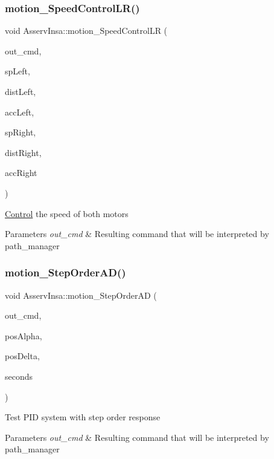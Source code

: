 \subsubsection{\texorpdfstring{motion\+\_\+\+Speed\+Control\+L\+R()}{motion\_SpeedControlLR()}}
{\footnotesize\ttfamily void Asserv\+Insa\+::motion\+\_\+\+Speed\+Control\+LR (\begin{DoxyParamCaption}\item[{\hyperlink{structRobotCommand}{Robot\+Command} $\ast$}]{out\+\_\+cmd,  }\item[{float}]{sp\+Left,  }\item[{float}]{dist\+Left,  }\item[{float}]{acc\+Left,  }\item[{float}]{sp\+Right,  }\item[{float}]{dist\+Right,  }\item[{float}]{acc\+Right }\end{DoxyParamCaption})}

\hyperlink{classControl}{Control} the speed of both motors 
\begin{DoxyParams}{Parameters}
{\em out\+\_\+cmd} & Resulting command that will be interpreted by path\+\_\+manager \\
\hline
\end{DoxyParams}
\mbox{\label{classAsservInsa_ab9a32335b1fe9484243f5849680fe510}} 
\subsubsection{\texorpdfstring{motion\+\_\+\+Step\+Order\+A\+D()}{motion\_StepOrderAD()}}
{\footnotesize\ttfamily void Asserv\+Insa\+::motion\+\_\+\+Step\+Order\+AD (\begin{DoxyParamCaption}\item[{\hyperlink{structRobotCommand}{Robot\+Command} $\ast$}]{out\+\_\+cmd,  }\item[{int32}]{pos\+Alpha,  }\item[{int32}]{pos\+Delta,  }\item[{int}]{seconds }\end{DoxyParamCaption})}

Test P\+ID system with step order response 
\begin{DoxyParams}{Parameters}
{\em out\+\_\+cmd} & Resulting command that will be interpreted by path\+\_\+manager \\
\hline
\end{DoxyParams}
\mbox{\label{classAsservInsa_a8237e3dcb0d9c8852f692c466da10f32}} 
